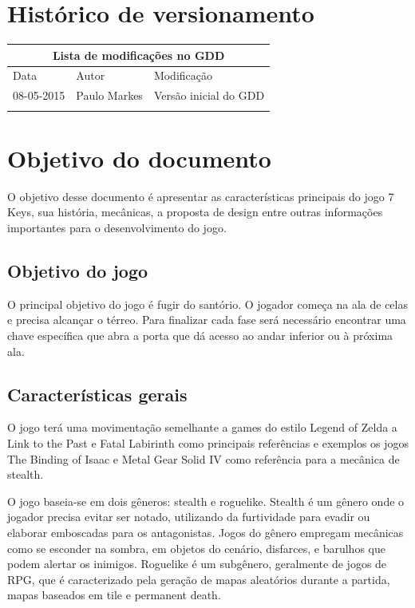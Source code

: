 \documentclass[12pt]{article}
\begin{document}

\onehalfspacing
\tableofcontents
\pagebreak
\section{Histórico de versionamento}
\begin{longtable}{|l|l|l|}
\hline
\multicolumn{3}{|c|}{Lista de modificações no GDD}
\\
\hline
Data & Autor & Modificação
\\
\hline
08-05-2015 & Paulo Markes & Versão inicial do GDD
\\
\hline
\\
\hline
\end{longtable}
\newpage
\section{Objetivo do documento}
O objetivo desse documento é apresentar as características principais do jogo 7 Keys, sua história, mecânicas, a proposta de design entre outras informações importantes para o desenvolvimento do jogo.

\subsection{Objetivo do jogo}     
O principal objetivo do jogo é fugir do santório. O jogador começa na ala de celas e precisa alcançar o térreo. Para finalizar cada fase será necessário encontrar uma chave específica que abra a porta que dá acesso ao andar inferior ou à próxima ala.

\subsection{Características gerais}

O jogo terá uma movimentação semelhante a games do estilo Legend of Zelda a Link to the Past e Fatal Labirinth como principais referências e exemplos os jogos The Binding of Isaac e Metal Gear Solid IV como referência para a mecânica de stealth.

 O jogo baseia-se em dois gêneros: stealth e roguelike. Stealth é um gênero onde o jogador precisa evitar ser notado, utilizando da furtividade para evadir ou elaborar emboscadas para os antagonistas. Jogos do gênero empregam mecânicas como se esconder na sombra, em objetos do cenário, disfarces, e barulhos que podem alertar os inimigos. Roguelike é um subgênero, geralmente de jogos de RPG, que é caracterizado pela geração de mapas aleatórios durante a partida, mapas baseados em tile e permanent death.
\end{document}
